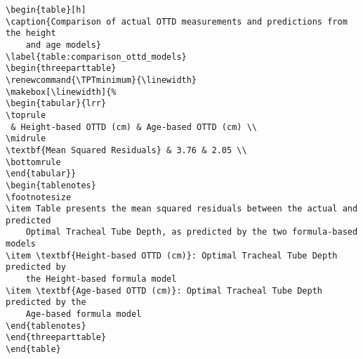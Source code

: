 \documentclass[11pt]{article}
\begin{document}
\begin{Verbatim}[tabsize=4]
\begin{table}[h]
\caption{Comparison of actual OTTD measurements and predictions from the height
	and age models}
\label{table:comparison_ottd_models}
\begin{threeparttable}
\renewcommand{\TPTminimum}{\linewidth}
\makebox[\linewidth]{%
\begin{tabular}{lrr}
\toprule
 & Height-based OTTD (cm) & Age-based OTTD (cm) \\
\midrule
\textbf{Mean Squared Residuals} & 3.76 & 2.05 \\
\bottomrule
\end{tabular}}
\begin{tablenotes}
\footnotesize
\item Table presents the mean squared residuals between the actual and predicted
	Optimal Tracheal Tube Depth, as predicted by the two formula-based models
\item \textbf{Height-based OTTD (cm)}: Optimal Tracheal Tube Depth predicted by
	the Height-based formula model
\item \textbf{Age-based OTTD (cm)}: Optimal Tracheal Tube Depth predicted by the
	Age-based formula model
\end{tablenotes}
\end{threeparttable}
\end{table}

\end{Verbatim}
\end{document}
